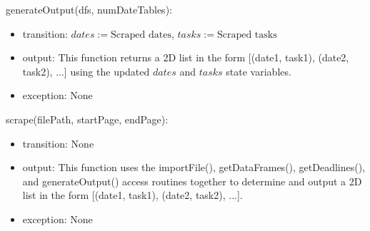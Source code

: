 \documentclass[12pt, titlepage]{article}
\begin{document}
\noindent generateOutput(dfs, numDateTables):
\begin{itemize}
\item transition: $\mathit{dates} := \text{Scraped dates}$, $\mathit{tasks} := \text{Scraped tasks}$
\item output: This function returns a 2D list in the form [(date1, task1), (date2, task2), ...] using the
updated $\mathit{dates}$ and $\mathit{tasks}$ state variables.
\item exception: None
\end{itemize}

\noindent scrape(filePath, startPage, endPage):
\begin{itemize}
\item transition: None
\item output: This function uses the importFile(), getDataFrames(), getDeadlines(), and generateOutput() access routines together
to determine and output a 2D list in the form [(date1, task1), (date2, task2), ...].
\item exception: None
\end{itemize}
\end{document}

